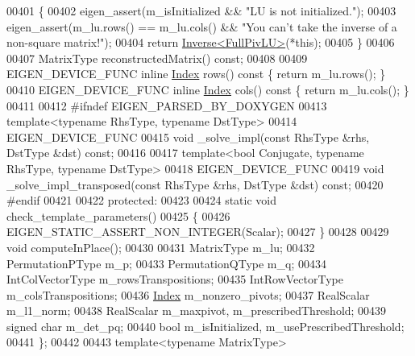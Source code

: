 \begin{DoxyCode}
00401 \textcolor{keyword}{    }\{
00402       eigen\_assert(m\_isInitialized && \textcolor{stringliteral}{"LU is not initialized."});
00403       eigen\_assert(m\_lu.rows() == m\_lu.cols() && \textcolor{stringliteral}{"You can't take the inverse of a non-square matrix!"});
00404       \textcolor{keywordflow}{return} \hyperlink{class_eigen_1_1_inverse}{Inverse<FullPivLU>}(*this);
00405     \}
00406 
00407     MatrixType reconstructedMatrix() \textcolor{keyword}{const};
00408 
00409     EIGEN\_DEVICE\_FUNC \textcolor{keyword}{inline} \hyperlink{group___core___module_a554f30542cc2316add4b1ea0a492ff02}{Index} rows()\textcolor{keyword}{ const }\{ \textcolor{keywordflow}{return} m\_lu.rows(); \}
00410     EIGEN\_DEVICE\_FUNC \textcolor{keyword}{inline} \hyperlink{group___core___module_a554f30542cc2316add4b1ea0a492ff02}{Index} cols()\textcolor{keyword}{ const }\{ \textcolor{keywordflow}{return} m\_lu.cols(); \}
00411 
00412 \textcolor{preprocessor}{    #ifndef EIGEN\_PARSED\_BY\_DOXYGEN}
00413     \textcolor{keyword}{template}<\textcolor{keyword}{typename} RhsType, \textcolor{keyword}{typename} DstType>
00414     EIGEN\_DEVICE\_FUNC
00415     \textcolor{keywordtype}{void} \_solve\_impl(\textcolor{keyword}{const} RhsType &rhs, DstType &dst) \textcolor{keyword}{const};
00416 
00417     \textcolor{keyword}{template}<\textcolor{keywordtype}{bool} Conjugate, \textcolor{keyword}{typename} RhsType, \textcolor{keyword}{typename} DstType>
00418     EIGEN\_DEVICE\_FUNC
00419     \textcolor{keywordtype}{void} \_solve\_impl\_transposed(\textcolor{keyword}{const} RhsType &rhs, DstType &dst) \textcolor{keyword}{const};
00420 \textcolor{preprocessor}{    #endif}
00421 
00422   \textcolor{keyword}{protected}:
00423 
00424     \textcolor{keyword}{static} \textcolor{keywordtype}{void} check\_template\_parameters()
00425     \{
00426       EIGEN\_STATIC\_ASSERT\_NON\_INTEGER(Scalar);
00427     \}
00428 
00429     \textcolor{keywordtype}{void} computeInPlace();
00430 
00431     MatrixType m\_lu;
00432     PermutationPType m\_p;
00433     PermutationQType m\_q;
00434     IntColVectorType m\_rowsTranspositions;
00435     IntRowVectorType m\_colsTranspositions;
00436     \hyperlink{group___core___module_a554f30542cc2316add4b1ea0a492ff02}{Index} m\_nonzero\_pivots;
00437     RealScalar m\_l1\_norm;
00438     RealScalar m\_maxpivot, m\_prescribedThreshold;
00439     \textcolor{keywordtype}{signed} \textcolor{keywordtype}{char} m\_det\_pq;
00440     \textcolor{keywordtype}{bool} m\_isInitialized, m\_usePrescribedThreshold;
00441 \};
00442 
00443 \textcolor{keyword}{template}<\textcolor{keyword}{typename} MatrixType>

\end{DoxyCode}
